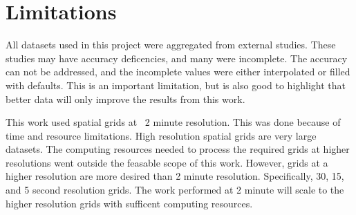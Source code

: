 \section{Limitations}
\setlength{\parindent}{10ex}
All datasets used in this project were aggregated from external studies.
These studies may have accuracy deficencies, and many were incomplete.
The accuracy can not be addressed, and the incomplete values were either interpolated or filled with defaults.
This is an important limitation, but is also good to highlight that better data will only improve the results from this work.

\par
This work used spatial grids at ~2 minute resolution.
This was done because of time and resource limitations.
High resolution spatial grids are very large datasets.
The computing resources needed to process the required grids at higher resolutions went outside the feasable scope of this work.
However, grids at a higher resolution are more desired than 2 minute resolution.
Specifically, 30, 15, and 5 second resolution grids.
The work performed at 2 minute will scale to the higher resolution grids with sufficent computing resources.